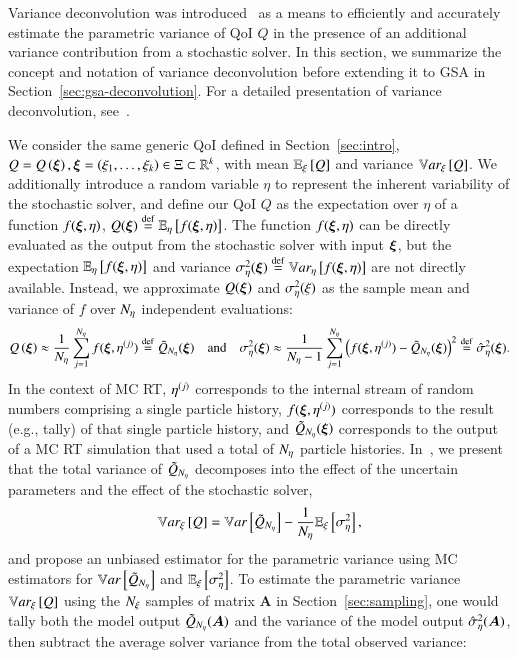 Variance deconvolution was introduced~\cite{clements-etal-2024, olson-2019} as a means to efficiently and accurately estimate the parametric variance of QoI $Q$ in the presence of an additional variance contribution from a stochastic solver.  
In this section, we summarize the concept and notation of variance deconvolution before extending it to GSA in Section~\ref{sec:gsa-deconvolution}.
For a detailed presentation of variance deconvolution, see~\cite{clements-etal-2024}. 

We consider the same generic QoI defined in Section~\ref{sec:intro}, $Q = Q\left( \bm{\xi} \right), \bm{\xi} = \left( \xi_1,\ldots,\xi_k \right) \in \Xi \subset \mathbb{R}^k$, with mean $\mathbb{E}_\xi\left[Q\right]$ and variance $\mathbb{V}ar_{\xi}\left[Q\right]$.
We additionally introduce a random variable $\eta$ to represent the inherent variability of the stochastic solver, and define our QoI $Q$ as the expectation over $\eta$ of a function $f(\bm{\xi}, \eta)$, $Q(\bm{\xi}) \overset{\operatorname{def}}{=} \mathbb{E}_\eta\left[f(\bm{\xi},\eta)\right]$. 
The function $f(\bm{\xi}, \eta)$ can be directly evaluated as the output from the stochastic solver with input $\bm{\xi}$, but the expectation $\mathbb{E}_\eta\left[f(\bm{\xi},\eta)\right]$ and variance $\sigma^2_\eta (\bm{\xi}) \overset{\operatorname{def}}{=} \mathbb{V}ar_{\eta}\left[f(\bm{\xi},\eta)\right]$ are not directly available.
Instead, we approximate $Q(\bm{\xi})$ and $\sigma^2_\eta(\xi)$ as the sample mean and variance of $f$ over ${N_\eta}$ independent evaluations:
\begin{equation*}
    Q\left(\bm{\xi}\right) \approx \frac{1}{{N_\eta}}\sum_{j=1}^{{N_\eta}} f (\bm{\xi}, \eta^{(j)}) \overset{\operatorname{def}}{=} \tilde{Q}_{{N_\eta}} (\bm{\xi}) \quad \text{and} \quad \sigma^2_\eta(\bm{\xi}) \approx \frac{1}{{N_\eta}-1} \sum_{j=1}^{{N_\eta}} \left( f(\bm{\xi}, \eta^{(j)} ) - \tilde{Q}_{{N_\eta}}(\bm{\xi}) \right)^2 \overset{\operatorname{def}}{=} \hat{\sigma}^2_\eta (\bm{\xi}) .
\end{equation*}
In the context of MC RT, $\eta^{(j)}$ corresponds to the internal stream of random numbers comprising a single particle history, $f(\bm{\xi},\eta^{(j)})$ corresponds to the result (e.g., tally) of that single particle history, and $\tilde{Q}_{{N_\eta}}(\bm{\xi})$ corresponds to the output of a MC RT simulation that used a total of ${N_\eta}$ particle histories.
In~\cite{clements-etal-2024}, we present that the total variance of $\tilde{Q}_{{N_\eta}}$ decomposes into the effect of the uncertain parameters and the effect of the stochastic solver, 
\begin{equation} \label{eq:deconv}
    \mathbb{V}ar_{\xi}\left[Q\right] = \mathbb{V}ar\left[\tilde{Q}_{{N_\eta}}\right] - \frac{1}{{N_\eta}}\mathbb{E}_\xi\left[\sigma^2_\eta\right],
\end{equation}
and propose an unbiased estimator for the parametric variance using MC estimators for $\mathbb{V}ar\left[\tilde{Q}_{{N_\eta}}\right]$ and $\mathbb{E}_\xi\left[\sigma^2_\eta\right]$.
To estimate the parametric variance $\mathbb{V}ar_{\xi}\left[Q\right]$ using the ${N_\xi}$ samples of matrix $\bm{A}$ in Section~\ref{sec:sampling}, one would tally both the model output $\tilde{Q}_{{N_\eta}}(\bm{A})$ and the variance of the model output $\hat{\sigma}^2_\eta(\bm{A})$, then subtract the average solver variance from the total observed variance:

